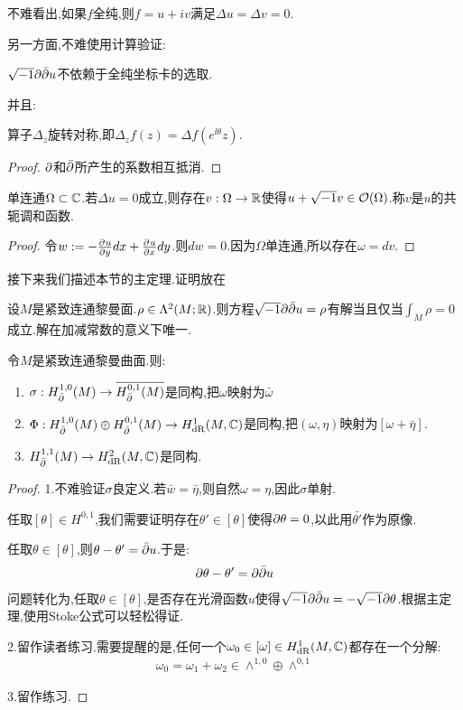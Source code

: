 不难看出,如果$f$全纯,则$f=u+iv$满足$\Delta u=\Delta v=0$.

另一方面,不难使用计算验证:
\begin{proposition}
	$\sqrt{-1} \partial\bar{\partial} u$不依赖于全纯坐标卡的选取.
\end{proposition}
并且:
\begin{proposition}
	算子$\Delta_z$旋转对称,即$\Delta_z f(z)=\Delta f(e^{\ii\theta}z)$.
\end{proposition}
\begin{proof}
	$\partial$和$\bar{\partial}$所产生的系数相互抵消.
\end{proof}
\begin{proposition}
	单连通$\Omega \subset \mathbb{C}$.若$\Delta u=0$成立,则存在$v:\Omega \to \mathbb{R}$使得$u+\sqrt{-1} v \in \mathcal{O}(\Omega)$.称$v$是$u$的共轭调和函数.
\end{proposition}
\begin{proof}
	令$w:=-\frac{\partial^{} u}{\partial {y}^{}}dx+\frac{\partial^{} u}{\partial {x}^{}}dy$.则$dw=0$.因为$\Omega$单连通,所以存在$\omega=dv$.
\end{proof}
接下来我们描述本节的主定理.证明放在%

\begin{theorem}
	设$M$是紧致连通黎曼面.$\rho \in \Lambda^2(M;\mathbb{R})$.则方程$\sqrt{-1} \partial\bar{\partial} u=\rho$有解当且仅当$\int_M \rho=0$成立.解在加减常数的意义下唯一.
\end{theorem}
\begin{corollary}
	令$M$是紧致连通黎曼曲面.则:
	\begin{enumerate}
		\item $\sigma:H^{1,0}_{\bar{\partial}}(M) \to \overline{H^{0,1}_{\bar{\partial}}{(M)}}$是同构,把$\omega$映射为$\bar{\omega}$
		\item $\Phi:H^{1,0}_{\bar{\partial}}(M)\oplus H_{\bar{\partial}}^{0,1}(M)\to H_{\mathrm{dR}}^1(M,\mathbb{C})$是同构,把$(\omega,\eta)$映射为$[\omega+\bar{\eta}]$.
		\item $H^{1,1}_{\bar{\partial}}(M)\to H_{\mathrm{dR}}^2(M,\mathbb{C})$是同构.
	\end{enumerate}
	
\end{corollary}
\begin{proof}
	1.不难验证$\sigma$良定义.若$\bar{w}=\bar{\eta}$,则自然$\omega=\eta$,因此$\sigma$单射.

	任取$[\theta] \in H^{0,1}$,我们需要证明存在$\theta'\in [\theta]$使得$\partial\theta=0$,以此用$\bar{\theta'}$作为原像.

	任取$\theta\in [\theta]$,则$\theta-\theta'=\bar{\partial}{u}$.于是:
	\begin{align*}
		\partial{\theta-\theta'}=\partial\bar{\partial} u
	\end{align*}
	问题转化为,任取$\theta\in [\theta]$,是否存在光滑函数$u$使得$\sqrt{-1} \partial\bar{\partial} u=-\sqrt{-1} \partial \theta$.根据主定理,使用Stoke公式可以轻松得证.

	2.留作读者练习.需要提醒的是,任何一个$\omega_0 \in [\omega] \in H_{\mathrm{dR}}^1(M,\mathbb{C})$都存在一个分解:
	\begin{align*}
		\omega_0 =\omega_1+\omega_2 \in \wedge^{1,0}\oplus \wedge^{0,1}
	\end{align*}

	3.留作练习.
\end{proof}

